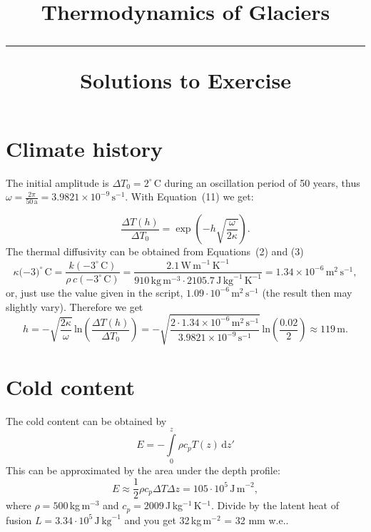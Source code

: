 \documentclass[DIV15,11pt,parskip=half]{scrartcl}
\newcommand{\unit}[1]{\ensuremath{\,\mathrm{#1}}}
\newcommand{\cels}[1]{\ensuremath{#1^{\circ}\,\mathrm{C}}}
\begin{document}
\vspace{-5em}

\title{Thermodynamics of Glaciers \\[.2em]
\rule[1em]{\textwidth}{2pt}
\LARGE\textsf{Solutions to Exercise}
}
\date{}

\maketitle


\vspace{-5em}


\section{Climate history}

The initial amplitude is $\Delta T_0 = \cels{2}$ during an oscillation period of 50 years, thus $\omega = \frac{2\pi}{50\,\text{a}} = 3.9821\times 10^{-9}\,\text{s}^{-1}$. With Equation~(11) we get:

 \begin{equation*}
   \label{eq:temp-depth-amplitude}
   \frac{\Delta T(h)}{\Delta T_0}= \exp\left(-h \sqrt{\frac{\omega}{2\kappa}}\right).
 \end{equation*} The thermal diffusivity can be obtained from Equations~(2) and (3)
\begin{equation*}
\kappa(-\cels{3)} = \frac{k(-\cels{3})}{\rho\,c(-\cels{3})} = \frac{2.1\,\text{W}\,\text{m}^{-1}\,\text{K}^{-1}}{910\,\text{kg}\,\text{m}^{-3} \cdot 2105.7\,\text{J}\,\text{kg}^{-1}\,\text{K}^{-1}} = 1.34\times 10^{-6}\,\text{m}^{2}\,\text{s}^{-1}, 
\end{equation*} or, just use the value given in the script, $1.09\cdot 10^{-6}\unit{m}^{2}\unit{s}^{-1}$ (the result then may slightly vary).
Therefore we get
\begin{equation*}
  h = -\sqrt{\frac{2\kappa}{\omega}}\,\text{ln}\left(\frac{\Delta T(h)}{\Delta T_0}\right)
  = - \sqrt{\frac{2\cdot 1.34\times 10^{-6}\,\text{m}^{2}\,\text{s}^{-1}}{3.9821\times 10^{-9}\,\text{s}^{-1}}}\,\text{ln}\left( \frac{0.02}{2}\right) \approx 119\,\text{m}.
\end{equation*}

\section{Cold content}
 
The cold content can be obtained by
\begin{equation*}
E = -\int \limits_0^z \rho c_p T(z) \,\mathrm{d} z'
\end{equation*}
This can be approximated by the area under the depth profile:
\begin{equation*}
E \approx \frac{1}{2}\rho c_p\Delta T\Delta z = 105 \cdot 10^5\,\mathrm{J\,m}^{-2},
\end{equation*} where $\rho=500\,$kg\,m$^{-3}$ and $c_p=2009$\,J\,kg$^{-1}$\,K$^{-1}$.
Divide by the latent heat of fusion $L=3.34\cdot10^5\,\mathrm{J\,kg}^{-1}$ and you get 32\,kg\,m$^{-2}$ = 32 mm w.e..
\end{document}
